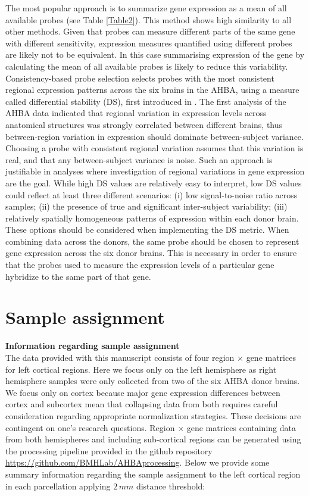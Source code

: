 The most popular approach is to summarize gene expression as a mean of all available probes (see Table \ref{Table2}). This method shows high similarity to all other methods. Given that probes can measure different parts of the same gene with different sensitivity, expression measures quantified using different probes are likely not to be equivalent. In this case summarising expression of the gene by calculating the mean of all available probes is likely to reduce this variability.
Consistency-based probe selection selects probes with the most consistent regional expression patterns across the six brains in the AHBA, using a measure called differential stability (DS), first introduced in  \citet{Hawrylycz2015}. The first analysis of the AHBA data indicated that regional variation in expression levels across anatomical structures was strongly correlated between different brains, thus between-region variation in expression should dominate between-subject variance. Choosing a probe with consistent regional variation assumes that this variation is real, and that any between-subject variance is noise. Such an approach is justifiable in analyses where investigation of regional variations in gene expression are the goal. While high DS values are relatively easy to interpret, low DS values could reflect at least three different scenarios: (i) low signal-to-noise ratio across samples; (ii) the presence of true and significant inter-subject variability; (iii) relatively spatially homogeneous patterns of expression within each donor brain. These options should be considered when implementing the DS metric.
When combining data across the donors, the same probe should be chosen to represent gene expression across the six donor brains. This is necessary in order to ensure that the probes used to measure the expression levels of a particular gene hybridize to the same part of that gene.

\section{Sample assignment}
\label{app:AppendixCh4_4}

\textbf{Information regarding sample assignment}\\
The data provided with this manuscript consists of four region $\times$ gene matrices for left cortical regions. Here we focus only on the left hemisphere as right hemisphere samples were only collected from two of the six AHBA donor brains. We focus only on cortex because major gene expression differences between cortex and subcortex mean that collapsing data from both requires careful consideration regarding appropriate normalization strategies. These decisions are contingent on one’s research questions. Region $\times$ gene matrices containing data from both hemispheres and including sub-cortical regions can be generated using the processing pipeline provided in the github repository \url{https://github.com/BMHLab/AHBAprocessing}. Below we provide some summary information regarding the sample assignment to the left cortical region in each parcellation applying $2\,mm$ distance threshold:

